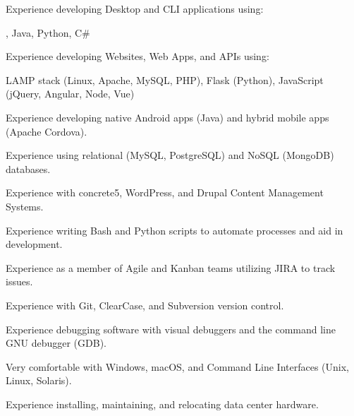 \begin{itemize*}
  \item Experience developing Desktop and CLI applications using:
  \begin{itemize*}
    \vspace{-0.2em}
    \item \CPP, Java, Python, C\#
    \vspace{-0.2em}
  \end{itemize*}
  \item Experience developing Websites, Web Apps, and APIs using:
  \begin{itemize*}
    \vspace{-0.2em}
    \item LAMP stack (Linux, Apache, MySQL, PHP), Flask (Python), JavaScript (jQuery, Angular, Node, Vue)
  \end{itemize*}
    \vspace{-0.2em}
  \item Experience developing native Android apps (Java) and hybrid mobile apps (Apache Cordova).
  \item Experience using relational (MySQL, PostgreSQL) and NoSQL (MongoDB) databases.
  \item Experience with concrete5, WordPress, and Drupal Content Management Systems.
  \item Experience writing Bash and Python scripts to automate processes and aid in development.
  \item Experience as a member of Agile and Kanban teams utilizing JIRA to track issues.
  \item Experience with Git, ClearCase, and Subversion version control.
  \item Experience debugging software with visual debuggers and the command line GNU debugger (GDB).
  \item Very comfortable with Windows, macOS, and Command Line Interfaces (Unix, Linux, Solaris).
  \item Experience installing, maintaining, and relocating data center hardware.
\end{itemize*}


